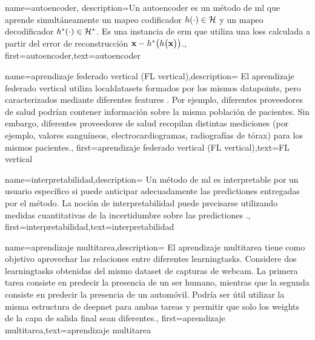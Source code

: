 {name={autoencoder},
	description={Un autoencoder es un método de \gls{ml} que aprende simultáneamente un mapeo codificador
		$h(\cdot) \in \mathcal{H}$ y un mapeo decodificador $h^{*}(\cdot) \in \mathcal{H}^{*}$. 
		Es una instancia de \gls{erm} que utiliza una \gls{loss} calculada a partir del error de reconstrucción 
		${\bf x} - h^{*}\big(  h \big( {\bf x} \big) \big)$.},
	first={autoencoder},text={autoencoder}
} 

{name={aprendizaje federado vertical (FL vertical)},description=
	{El aprendizaje federado vertical utiliza \gls{localdataset}s
	 formados por los mismos \gls{datapoint}s, pero caracterizados mediante diferentes \gls{feature}s \cite{VFLChapter}. 
    Por ejemplo, diferentes proveedores de salud podrían contener información
	 sobre la misma población de pacientes. Sin embargo, diferentes proveedores de salud
	 recopilan distintas mediciones (por ejemplo, valores sanguíneos, electrocardiogramas, radiografías de tórax)
	 para los mismos pacientes.},
	first={aprendizaje federado vertical (FL vertical)},text={FL vertical}
} 

{name={interpretabilidad},description=
		{Un método de \gls{ml} es interpretable  por un usuario específico si
		puede anticipar adecuadamente las \gls{prediction}es entregadas por el método. 
		La noción de interpretabilidad puede precisarse utilizando medidas cuantitativas
		de la incertidumbre sobre las \gls{prediction}es \cite{JunXML2020}.},
		first={interpretabilidad},text={interpretabilidad}
}

{name={aprendizaje multitarea},description=
	{El aprendizaje multitarea tiene como objetivo aprovechar las relaciones entre diferentes \gls{learningtask}s. 
	Considere dos \gls{learningtask}s obtenidas del mismo \gls{dataset} de capturas de webcam.
	La primera tarea consiste en predecir la presencia de un ser humano, 
	mientras que la segunda consiste en predecir la presencia de un automóvil. Podría ser útil utilizar la misma estructura de \gls{deepnet} para ambas tareas y permitir que solo los \gls{weights} 
	de la capa de salida final sean diferentes.},
	first={aprendizaje multitarea},text={aprendizaje multitarea}
}

